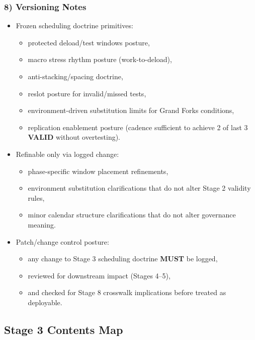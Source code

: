 \documentclass[10pt]{article}
\begin{document}
\subsubsection*{8) Versioning Notes}

\begin{itemize}
\item Frozen scheduling doctrine primitives:
  \begin{itemize}
  \item protected deload/test windows posture,
  \item macro stress rhythm posture (work-to-deload),
  \item anti-stacking/spacing doctrine,
  \item reslot posture for invalid/missed tests,
  \item environment-driven substitution limits for Grand Forks conditions,
  \item replication enablement posture (cadence sufficient to achieve 2 of last 3 \textbf{VALID} without overtesting).
  \end{itemize}
\item Refinable only via logged change:
  \begin{itemize}
  \item phase-specific window placement refinements,
  \item environment substitution clarifications that do not alter Stage 2 validity rules,
  \item minor calendar structure clarifications that do not alter governance meaning.
  \end{itemize}
\item Patch/change control posture:
  \begin{itemize}
  \item any change to Stage 3 scheduling doctrine \textbf{MUST} be logged,
  \item reviewed for downstream impact (Stages 4–5),
  \item and checked for Stage 8 crosswalk implications before treated as deployable.
  \end{itemize}
\end{itemize}

\subsection*{Stage 3 Contents Map}
{}
\end{document}
